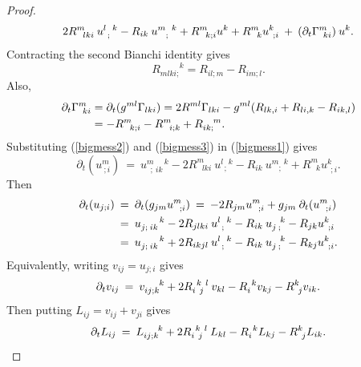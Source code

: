 \begin{proof}
\begin{align}
2 R^m_{\: \: \: lki} \: u^{l \: \: \: k}_{\: \: ;} - R_{ik} \:
u^{m \: \: \: k}_{\: \: \: \: ;}
+ R^m_{\: \: \: k;i} u^k +
R^m_{\: \: \: k} u^k_{\: \: ;i} \: + \:
(\partial_t \Gamma^m_{\: \: ki}) \: u^k. \notag
\end{align}
Contracting the second Bianchi identity gives
\begin{equation} \label{bigmess2}
R_{mlki;}^{\: \: \: \: \: \: \: \: \: \: \: k} = R_{il;m} - R_{im;l}.
\end{equation}
Also,
\begin{align} \label{bigmess3}
\partial_t \Gamma^m_{\: \: ki} & = \partial_t ( g^{ml} \Gamma_{lki}) =
2 R^{ml} \Gamma_{lki} - g^{ml} (R_{lk,i} + R_{li,k} - R_{ik,l}) \\
& = - R^m_{\: \: \: k;i} - R^m_{\: \: \: i;k} +
R^{\: \: \: \: \: m}_{ik;}.  \notag
\end{align}
Substituting (\ref{bigmess2}) and (\ref{bigmess3}) in (\ref{bigmess1})
gives
\begin{equation}
\partial_t (u^m_{\: ; i}) \: = \:
u^{m \: \: \: \: \: \: k}_{\: \: ;\:ik} -
2 R^m_{\: \: \: lki} \: u^{l \: \: \: k}_{\: \: ;} - R_{ik} \:
u^{m \: \: \: k}_{\: \: \: \: ;} +
R^m_{\: \: \: k} u^k_{\: \: ;i}.
\end{equation}
Then
\begin{align}
\partial_t (u_{j ; i}) \: & = \:
\partial_t (g_{jm} u^m_{\: \: \: ; i}) \: = \:
-2 R_{jm} u^m_{\: \: \: ; i} + g_{jm} \: \partial_t (u^m_{\: \: \: ; i}) \\
& = \:
u^{\: \: \: \: \: \: \: \: \: k}_{j  ;\:ik} -
2 R_{jlki} \: u^{l \: \: \: k}_{\: \: ;} - R_{ik} \:
u^{\: \: \: \: k}_{j  \: ;} -
R_{jk} u^k_{\: \: ;i} \notag \\
& = \:
u^{\: \: \: \: \: \: \: \: \: k}_{j  ;\:ik} +
2 R_{ikjl} \: u^{l \: \: \: k}_{\: \: ;} - R_{ik} \:
u^{\: \: \: \: k}_{j  \: ;} -
R_{kj} u^k_{\: \: ;i}. \notag
\end{align}
Equivalently, writing $v_{ij} = u_{j ; i}$ gives
\begin{equation}
\partial_t v_{ij} \:  = \:
v^{\: \: \: \: \: \: \: k}_{ij  ;k} +
2 R^{\: \: k \: \: l}_{i \: \: j} \: v_{kl} - R_{i}^{\: \: k}
v_{kj} -
R^k_{\: \: j} v_{ik}. \notag
\end{equation}
Then putting $L_{ij} = v_{ij} + v_{ji}$ gives
\begin{equation}
\partial_t L_{ij} \:  = \:
L_{ij;k}^{\: \: \: \: \: \: \: k} +
2 R^{\: \: k \: \: l}_{i \: \: j} \: L_{kl} - R_{i}^{\: \: k}
L_{kj} -
R^k_{\: \: j} L_{ik}.  \notag
\end{equation}


\end{proof}
